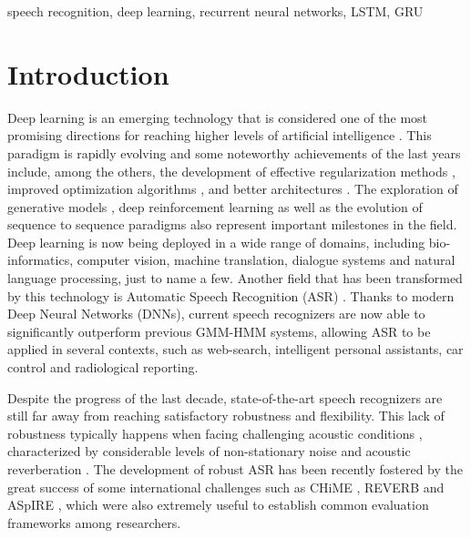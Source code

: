 \documentclass[journal]{IEEEtran}
\begin{document}
\begin{IEEEkeywords}
speech recognition, deep learning, recurrent neural networks, LSTM, GRU
\end{IEEEkeywords}


\IEEEpeerreviewmaketitle

\section{Introduction}
Deep learning is an emerging technology that is considered one of the most promising directions for reaching higher levels of artificial intelligence \cite{Goodfellow-et-al-2016-Book}. 
This paradigm is rapidly evolving and some noteworthy achievements of the last years include, among the others, the development of effective regularization methods \cite{dropout,batchnorm}, improved optimization algorithms \cite{adam}, and  better architectures \cite{cnn1,tdnn2,lstm_highway,gru1}. The exploration of generative models \cite{gan}, deep reinforcement learning \cite{alpha_go} as well as the evolution of sequence to sequence paradigms \cite{dima_nmt} also represent important milestones in the field. Deep learning is now being deployed in a wide range of domains, including bio-informatics, computer vision, machine translation, dialogue systems and natural language processing, just to name a few.
Another field that has been transformed by this technology is Automatic Speech Recognition (ASR) \cite{lideng}.  Thanks to modern Deep Neural Networks (DNNs), current speech recognizers are now able to significantly outperform previous GMM-HMM systems, allowing ASR to be applied in several contexts, such as web-search, intelligent personal assistants, car control and radiological reporting.

Despite the progress of the last decade, state-of-the-art speech recognizers are still far away from reaching satisfactory robustness and flexibility. This lack of robustness typically happens  when facing challenging acoustic conditions \cite{adverse}, characterized by considerable levels of non-stationary noise and acoustic reverberation \cite{dsr_summary,pawel2,hain,dnn_rev,dnn_rev2,dnn3,ravanelli_SLT,ravanelli15,ravanelli_icassp}. 
The development of robust ASR has been recently fostered by the great success of some international challenges such as CHiME \cite{chime3}, REVERB \cite{revch_short} and ASpIRE \cite{aspire}, which were also extremely useful to establish common evaluation frameworks among researchers.
\end{document}

